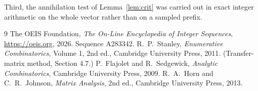 \documentclass[11pt,a4paper]{article}
\theoremstyle{plain}
\theoremstyle{definition}
\begin{document}
Third, the annihilation test of Lemma~\ref{lem:crit} was carried out in exact integer
arithmetic on the whole vector rather than on a sampled prefix.

\begin{thebibliography}{9}
 The OEIS Foundation, \emph{The On-Line Encyclopedia of Integer
Sequences}, \url{https://oeis.org}, 2026. Sequence A283342.
 R.~P.~Stanley, \emph{Enumerative Combinatorics}, Volume 1, 2nd ed.,
Cambridge University Press, 2011. (Transfer-matrix method, Section 4.7.)
 P.~Flajolet and R.~Sedgewick, \emph{Analytic Combinatorics}, Cambridge
University Press, 2009.
 R.~A.~Horn and C.~R.~Johnson, \emph{Matrix Analysis}, 2nd ed., Cambridge
University Press, 2013.
\end{thebibliography}
\end{document}
